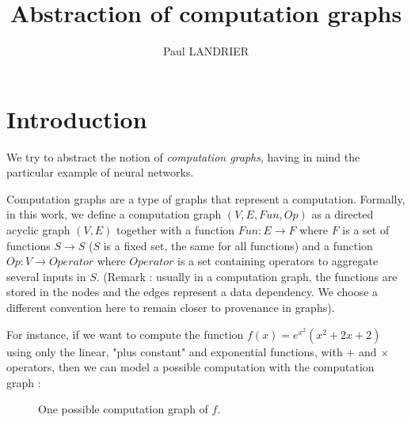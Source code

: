 \documentclass[11pt,a4paper]{article}
\author{Paul LANDRIER}
\title{Abstraction of computation graphs}
\date{}
\begin{document}
\maketitle

\section{Introduction}

We try to abstract the notion of \textit{computation graphs}, having in mind the particular example of neural networks.

	Computation graphs are a type of graphs that represent a computation. Formally, in this work, we define a computation graph $(V,E,Fun,Op)$ as a directed acyclic graph $(V,E)$ together with a function $Fun:E \to F$ where $F$ is a set of functions $S \to S$ ($S$ is a fixed set, the same for all functions) and a function $Op:V \to Operator$ where $Operator$ is a set containing operators to aggregate several inputs in $S$. (Remark : usually in a computation graph, the functions are stored in the nodes and the edges represent a data dependency. We choose a different convention here to remain closer to provenance in graphs).
	
	For instance, if we want to compute the function $f(x)=e^{x^2}(x^2 + 2x + 2)$ using only the linear, "plus constant" and exponential functions, with $+$ and $\times$ operators, then we can model a possible computation with the computation graph :
	
	\begin{figure}[!h]
	\centering
	\caption{One possible computation graph of $f$.}
	\label{fig:graphe_calc_ex}
	\end{figure}
	
\end{document}
